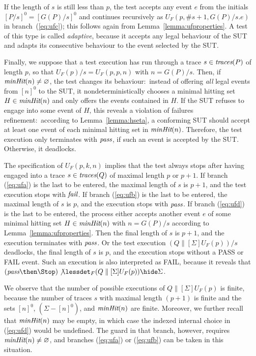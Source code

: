 If the length of $s$ is still less than $p$, the test accepts any event $e$
from the initials $[P/s]^0 = [G(P)/s]^0$ and continues recursively as
$U_F(p,\#s+1,G(P)/s.e)$ in branch~(\ref{eq:ufc}); this follows again from
Lemma~\ref{lemma:ufproperties}. A test of this type is called
\emph{adaptive}, because it accepts any legal behaviour of the SUT and adapts
its consecutive behaviour to the event selected by the SUT.

Finally, we suppose that a test execution has run through a trace
$s\in\text{\it traces}(P)$ of length $p$, so that $U_F(p)/s = U_F(p,p,n)$ with $n =
G(P)/s$. Then, if $\text{\it minHit}(n)\neq \varnothing$, the test changes its
behaviour:~instead of offering {\it all} legal events from $[n]^0$ to the
SUT, it nondeterministically chooses a minimal hitting set $H\in \text{\it minHit}(n)$
and only offers the events contained in $H$. If the SUT refuses to engage
into some event of $H$, this reveals a violation of failures
refinement:~according to Lemma~\ref{lemma:hseta}, a conforming SUT should
accept at least one event of each minimal hitting set in $\text{\it minHit}(n)$.
Therefore, the test execution only terminates with  ${\text{\it pass}}$, if such an
event is accepted by the SUT. Otherwise, it deadlocks.

The specification of $U_F(p,k,n)$ implies that the test always stops after
having engaged into a trace $s\in\text{\it traces}(Q)$ of maximal length $p$ or $p+1$. If
branch (\ref{eq:ufa}) is the last to be entered, the maximal length of $s$ is
$p+1$, and the test execution stops with ${\text{\it fail}}$. If branch (\ref{eq:ufb})
is the last to be entered, the maximal length of $s$ is $p$, and the
execution stops with ${\text{\it pass}}$. If branch (\ref{eq:ufd}) is the last to be
entered, the process either accepts another event $e$ of some minimal hitting
set $H\in\text{\it minHit}(n)$ with $n = G(P)/s$ according to
Lemma~\ref{lemma:ufproperties}. Then the final length of $s$ is $p+1$, and
the execution terminates with ${\text{\it pass}}$. Or the test execution
$(Q\parallel[\Sigma] U_F(p))/s$ deadlocks,  the final length of $s$ is $p$,
and the execution stops without a PASS or FAIL event. Such an execution is
also interpreted as FAIL, because it reveals that $(\epass\then\Stop)
\not\lessdet_F (Q\parallel[\Sigma] U_F(p)) \hide \Sigma$.

We observe that the number of possible executions of $Q\parallel[\Sigma]
U_F(p)$ is finite, because the number of traces $s$ with maximal length
$(p+1)$ is finite and the sets $[n]^0$, $(\Sigma - [n]^0)$, and $\text{\it minHit}(n)$
are finite. Moreover, we further recall that $\text{\it minHit}(n)$ may be empty, in
which case the indexed internal choice in (\ref{eq:ufd}) would be undefined.
The guard in that branch, however, requires $\text{\it minHit}(n)\neq\varnothing$, and
branches (\ref{eq:ufa}) or (\ref{eq:ufb}) can be taken in this situation.

